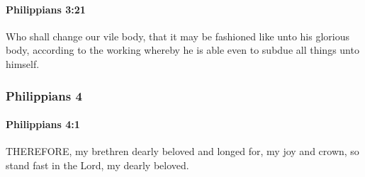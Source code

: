 		\paragraph{Philippians 3:21} %
			\label{PHILIPPIANS-3-21}

			Who shall change our vile body, that it may be fashioned like unto his glorious body, according to the working whereby he is able even to subdue all things unto himself.

			\begin{framed}
			\scriptsize
				\begin{compactdesc}
					\item[SBLG]  \hyperref[HUPOTASSO]{} 
				\end{compactdesc}
			\end{framed}

	\subsubsection{Philippians 4} %
		\label{PHILIPPIANS-4}
		
		\paragraph{Philippians 4:1} %
			\label{PHILIPPIANS-4-1}

			THEREFORE, my brethren dearly beloved and longed for, my joy and crown, so stand fast in the Lord, my dearly beloved.


